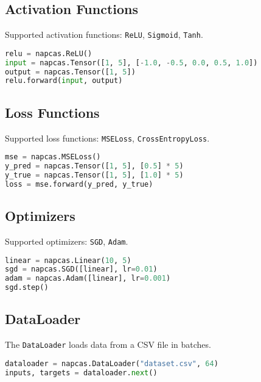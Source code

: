 \documentclass[a4paper,11pt]{article}
\begin{document}
\subsection{Activation Functions}
Supported activation functions: \texttt{ReLU}, \texttt{Sigmoid}, \texttt{Tanh}.

\begin{lstlisting}[language=Python]
relu = napcas.ReLU()
input = napcas.Tensor([1, 5], [-1.0, -0.5, 0.0, 0.5, 1.0])
output = napcas.Tensor([1, 5])
relu.forward(input, output)
\end{lstlisting}

\subsection{Loss Functions}
Supported loss functions: \texttt{MSELoss}, \texttt{CrossEntropyLoss}.

\begin{lstlisting}[language=Python]
mse = napcas.MSELoss()
y_pred = napcas.Tensor([1, 5], [0.5] * 5)
y_true = napcas.Tensor([1, 5], [1.0] * 5)
loss = mse.forward(y_pred, y_true)
\end{lstlisting}

\subsection{Optimizers}
Supported optimizers: \texttt{SGD}, \texttt{Adam}.

\begin{lstlisting}[language=Python]
linear = napcas.Linear(10, 5)
sgd = napcas.SGD([linear], lr=0.01)
adam = napcas.Adam([linear], lr=0.001)
sgd.step()
\end{lstlisting}

\subsection{DataLoader}
The \texttt{DataLoader} loads data from a CSV file in batches.

\begin{lstlisting}[language=Python]
dataloader = napcas.DataLoader("dataset.csv", 64)
inputs, targets = dataloader.next()
\end{lstlisting}
\end{document}
